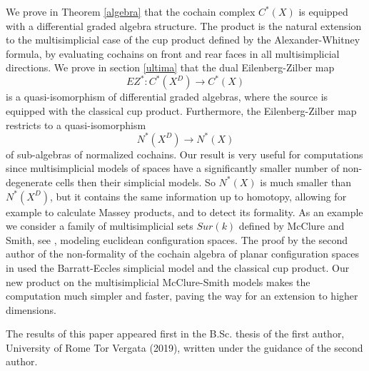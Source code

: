 \documentclass[a4paper,11pt]{article}
\theoremstyle{remark}
\theoremstyle{definition}
\begin{document}
 We prove in Theorem \ref{algebra}  %
 that the cochain complex $C^*(X)$ is equipped with a differential graded algebra structure.
 The product is the natural extension to the multisimplicial case of the cup product  defined by the Alexander-Whitney formula, by
  evaluating cochains on front and rear faces in all multisimplicial directions. %
  We prove in section \ref{ultima}
   that the dual Eilenberg-Zilber map
 $$EZ^*:C^*(X^D) \to C^*(X)$$ %
  is a quasi-isomorphism of differential graded algebras, where the source is equipped with the classical cup product.  
 Furthermore, the Eilenberg-Zilber map restricts to a quasi-isomorphism $$N^*(X^D) \to N^*(X)$$ of sub-algebras of normalized cochains.   
 Our result is very useful for computations since multisimplicial models of spaces have a significantly smaller number of non-degenerate cells then their simplicial models.
So $N^*(X)$ is much smaller than $N^*(X^D)$, but it contains the same information up to homotopy, 
allowing for example 
to calculate Massey products, and to detect its formality. 
As an example we consider a family of multisimplicial sets $Sur(k)$ defined  by McClure and Smith, see \cite{MS},  modeling euclidean configuration spaces.
The proof by the second author of the non-formality of the cochain algebra of planar configuration spaces in \cite{formality}  used the Barratt-Eccles simplicial model and the classical cup product.
Our new product on the multisimplicial McClure-Smith models makes the computation much simpler and faster, paving the way for an extension to higher dimensions. 

\medskip



The results of this paper appeared first in the B.Sc. thesis of the first author, University of Rome Tor Vergata (2019), written under the guidance of the second author.
\end{document}

